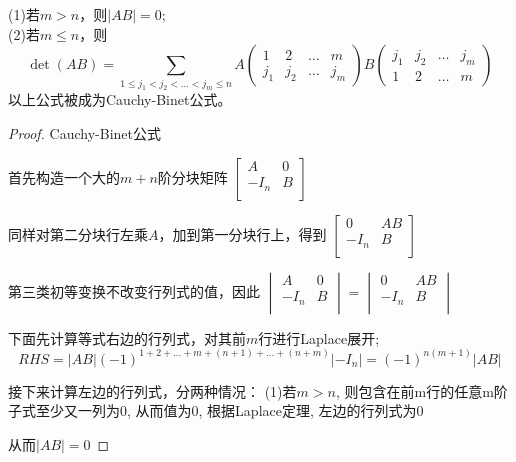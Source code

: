\begin{theorem}{}{}
 (1)若$m>n$，则$|AB|= 0$; \\
 (2)若$m\leq n$，则
    \[
    \det(AB) = \sum_{1\leq j_1<j_2<\dots<j_m\leq n} 
    A\begin{pmatrix}
      1 & 2 & \dots & m \\
      j_1 & j_2 & \dots & j_m 
    \end{pmatrix}
    B\begin{pmatrix}
      j_1 & j_2 & \dots & j_m \\
      1 & 2 & \dots & m 
    \end{pmatrix}
    \]
    以上公式被成为Cauchy-Binet公式。
\end{theorem}
\begin{proof}{Cauchy-Binet公式}{}

  首先构造一个大的$m+n$阶分块矩阵
  $\begin{bmatrix}
    A & 0 \\
    -I_n & B \\
  \end{bmatrix}$

  同样对第二分块行左乘$A$，加到第一分块行上，得到
  $\begin{bmatrix}
    0 & AB \\
    -I_n & B \\
  \end{bmatrix}$

  第三类初等变换不改变行列式的值，因此
  $\begin{vmatrix}
    A & 0 \\
    -I_n & B \\
  \end{vmatrix}
  =
  \begin{vmatrix}
    0 & AB \\
    -I_n & B \\
  \end{vmatrix}$

  下面先计算等式右边的行列式，对其前$m$行进行Laplace展开; 
  \[RHS=|AB|(-1)^{1+2+\dots+m+(n+1)+\dots+(n+m)}|-I_n|=(-1)^{n(m+1)}|AB|\]

  接下来计算左边的行列式，分两种情况：
  (1)若$m>n$, 则包含在前m行的任意m阶子式至少又一列为0, 从而值为0, 根据Laplace定理, 左边的行列式为0

  从而$|AB|=0$


\end{proof}
